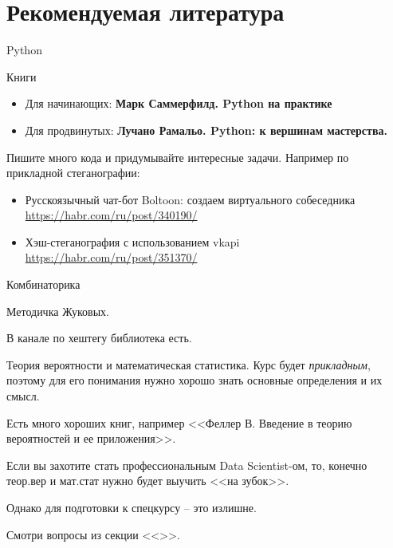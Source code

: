 \documentclass{beamer}
\newcommand{\рис}[1]{рис.\ref{#1}}
\newcommand{\Рис}[1]{Рис.\ref{#1}}
\newcommand{\таблицa}[1]{таблица~№\ref{#1}} %
\newcommand{\таблицы}[1]{таблицы~№\ref{#1}} %
\newcommand{\таблице}[1]{таблице~№\ref{#1}} %
\newcommand{\таблицу}[1]{таблицу~№\ref{#1}} %
\newcommand{\таблицей}[1]{таблицей~№\ref{#1}} %
\newcommand{\Таблицa}[1]{Таблица~№\ref{#1}} %
\newcommand{\Таблицы}[1]{Таблицы~№\ref{#1}} %
\newcommand{\Таблице}[1]{Таблице~№\ref{#1}} %
\newcommand{\Таблицу}[1]{Таблицу~№\ref{#1}} %
\newcommand{\Таблицей}[1]{Таблицей~№\ref{#1}} %
\begin{document}
  
  
  \section{Рекомендуемая литература}\label{section:literature}
  
  \begin{frame}{Python}
  
  Книги
  \begin{itemize}
  	\item Для начинающих: 
  	\textbf{Марк Саммерфилд. Python на практике} 
  	\item 
  	Для продвинутых:
  	\textbf{Лучано Рамальо. Python: к вершинам мастерства.}
  \end{itemize}
  
  Пишите много кода и придумывайте интересные задачи. 
  Например по прикладной стеганографии:
  \begin{itemize}
  	\item Русскоязычный чат-бот Boltoon: создаем виртуального собеседника
  	\url{https://habr.com/ru/post/340190/}
  	\item Хэш-стеганография с использованием vkapi
  	\url{https://habr.com/ru/post/351370/}
  \end{itemize}
\end{frame}
	
	\begin{frame}{Комбинаторика}
	
	Методичка Жуковых. 
	
	В канале по хештегу библиотека есть.
	
	\end{frame}

\begin{frame}{Теория вероятности и математическая статистика.}
Курс будет \textit{прикладным}, поэтому для его понимания 
нужно хорошо знать основные определения и их смысл.

Есть много хороших книг, например 
<<Феллер В. Введение в теорию вероятностей и ее приложения>>.

Если вы захотите стать профессиональным Data Scientist-ом,
то, конечно теор.вер и мат.стат нужно будет выучить <<на зубок>>.

Однако для подготовки к спецкурсу -- это излишне.

Смотри вопросы из секции <<>>.
\end{frame}

   
  
\end{document}
